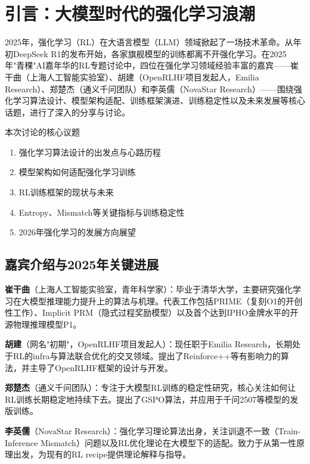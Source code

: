 \section{引言：大模型时代的强化学习浪潮}

2025年，强化学习（RL）在大语言模型（LLM）领域掀起了一场技术革命。从年初DeepSeek R1的发布开始，各家旗舰模型的训练都离不开强化学习。在2025年"青稞"AI嘉年华的RL专题讨论中，四位在强化学习领域经验丰富的嘉宾——崔干曲（上海人工智能实验室）、胡建（OpenRLHF项目发起人，Emilia Research）、郑楚杰（通义千问团队）和李英儒（NovaStar Research）——围绕强化学习算法设计、模型架构适配、训练框架演进、训练稳定性以及未来发展等核心话题，进行了深入的分享与讨论。

\begin{importantbox}{本次讨论的核心议题}
\begin{enumerate}
    \item 强化学习算法设计的出发点与心路历程
    \item 模型架构如何适配强化学习训练
    \item RL训练框架的现状与未来
    \item Entropy、Mismatch等关键指标与训练稳定性
    \item 2026年强化学习的发展方向展望
\end{enumerate}
\end{importantbox}

\subsection{嘉宾介绍与2025年关键进展}

\textbf{崔干曲}（上海人工智能实验室，青年科学家）：毕业于清华大学，主要研究强化学习在大模型推理能力提升上的算法与机理。代表工作包括PRIME（复刻O1的开创性工作）、Implicit PRM（隐式过程奖励模型）以及首个达到IPHO金牌水平的开源物理推理模型P1。

\textbf{胡建}（网名"初期"，OpenRLHF项目发起人）：现任职于Emilia Research，长期处于RL的infra与算法联合优化的交叉领域。提出了Reinforce++等有影响力的算法，并主导了OpenRLHF框架的设计与开发。

\textbf{郑楚杰}（通义千问团队）：专注于大模型RL训练的稳定性研究，核心关注如何让RL训练长期稳定地持续下去。提出了GSPO算法，并应用于千问2507等模型的发版训练。

\textbf{李英儒}（NovaStar Research）：强化学习理论算法出身，关注训退不一致（Train-Inference Mismatch）问题以及RL优化理论在大模型下的适配。致力于从第一性原理出发，为现有的RL recipe提供理论解释与指导。

